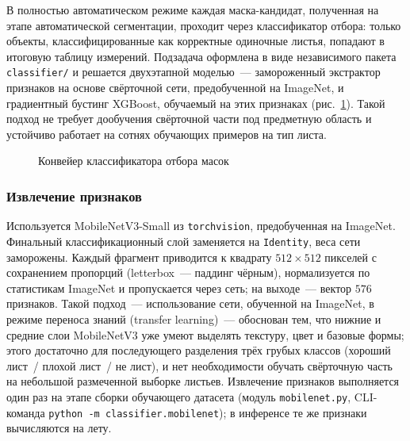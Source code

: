 В полностью автоматическом режиме каждая маска-кандидат, полученная на этапе
автоматической сегментации, проходит через классификатор отбора: только объекты,
классифицированные как корректные одиночные листья, попадают в итоговую таблицу
измерений. Подзадача оформлена в виде независимого пакета \texttt{classifier/}
и решается двухэтапной моделью~--- замороженный экстрактор признаков на основе
свёрточной сети, предобученной на ImageNet, и градиентный бустинг XGBoost,
обучаемый на этих признаках (рис.~\ref{fig:classifier_pipeline}). Такой
подход не требует дообучения свёрточной части под предметную область и
устойчиво работает на сотнях обучающих примеров на тип листа.

\begin{figure}[H]
    \centering
    \caption{Конвейер классификатора отбора масок}
    \label{fig:classifier_pipeline}
\end{figure}

\subsubsection*{Извлечение признаков}

Используется MobileNetV3-Small из \texttt{torchvision}, предобученная на ImageNet.
Финальный классификационный слой заменяется на \texttt{Identity}, веса сети
заморожены. Каждый фрагмент приводится к квадрату $512 \times 512$ пикселей с
сохранением пропорций (letterbox~--- паддинг чёрным), нормализуется по
статистикам ImageNet и пропускается через сеть; на выходе~--- вектор $576$
признаков. Такой подход~--- использование сети, обученной на ImageNet, в режиме
переноса знаний (transfer learning)~--- обоснован тем, что нижние и средние
слои MobileNetV3 уже умеют выделять текстуру, цвет и базовые формы; этого
достаточно для последующего разделения трёх грубых классов (хороший лист~/
плохой лист~/ не лист), и нет необходимости обучать свёрточную часть на
небольшой размеченной выборке листьев. Извлечение признаков выполняется один
раз на этапе сборки обучающего датасета (модуль \texttt{mobilenet.py},
CLI-команда \texttt{python -m classifier.mobilenet}); в инференсе те же признаки
вычисляются на лету.

